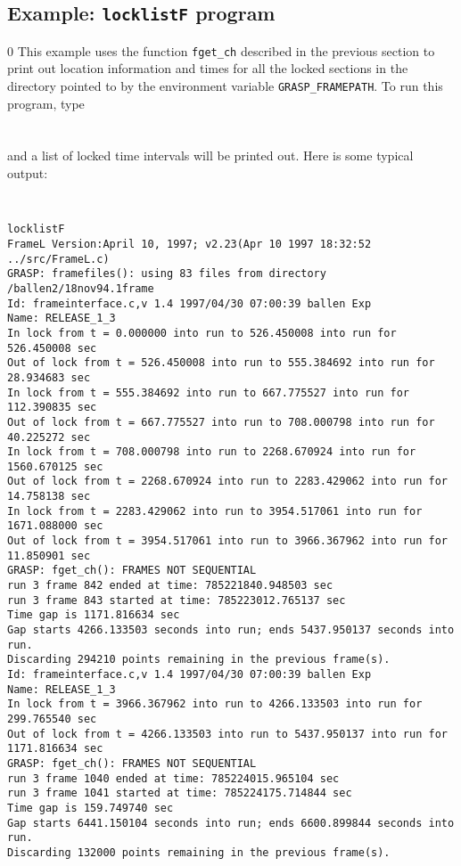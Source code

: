 \subsection{Example: {\tt locklistF} program}
\setcounter{equation}0
This example uses the function {\tt fget\_ch} described in the
previous section to print out location information and times for all
the locked sections in the directory pointed to by the environment
variable {\tt GRASP\_FRAMEPATH}.
To run this program, type\\
\\
\\
and a list of locked time intervals will be printed out. 
Here is some typical output:
{\footnotesize \tt
\begin{verbatim}
locklistF
FrameL Version:April 10, 1997; v2.23(Apr 10 1997 18:32:52 ../src/FrameL.c)
GRASP: framefiles(): using 83 files from directory /ballen2/18nov94.1frame
Id: frameinterface.c,v 1.4 1997/04/30 07:00:39 ballen Exp 
Name: RELEASE_1_3  
In lock from t = 0.000000 into run to 526.450008 into run for 526.450008 sec
Out of lock from t = 526.450008 into run to 555.384692 into run for 28.934683 sec
In lock from t = 555.384692 into run to 667.775527 into run for 112.390835 sec
Out of lock from t = 667.775527 into run to 708.000798 into run for 40.225272 sec
In lock from t = 708.000798 into run to 2268.670924 into run for 1560.670125 sec
Out of lock from t = 2268.670924 into run to 2283.429062 into run for 14.758138 sec
In lock from t = 2283.429062 into run to 3954.517061 into run for 1671.088000 sec
Out of lock from t = 3954.517061 into run to 3966.367962 into run for 11.850901 sec
GRASP: fget_ch(): FRAMES NOT SEQUENTIAL
run 3 frame 842 ended at time: 785221840.948503 sec
run 3 frame 843 started at time: 785223012.765137 sec
Time gap is 1171.816634 sec
Gap starts 4266.133503 seconds into run; ends 5437.950137 seconds into run.
Discarding 294210 points remaining in the previous frame(s).
Id: frameinterface.c,v 1.4 1997/04/30 07:00:39 ballen Exp 
Name: RELEASE_1_3  
In lock from t = 3966.367962 into run to 4266.133503 into run for 299.765540 sec
Out of lock from t = 4266.133503 into run to 5437.950137 into run for 1171.816634 sec
GRASP: fget_ch(): FRAMES NOT SEQUENTIAL
run 3 frame 1040 ended at time: 785224015.965104 sec
run 3 frame 1041 started at time: 785224175.714844 sec
Time gap is 159.749740 sec
Gap starts 6441.150104 seconds into run; ends 6600.899844 seconds into run.
Discarding 132000 points remaining in the previous frame(s).

\end{verbatim}}
